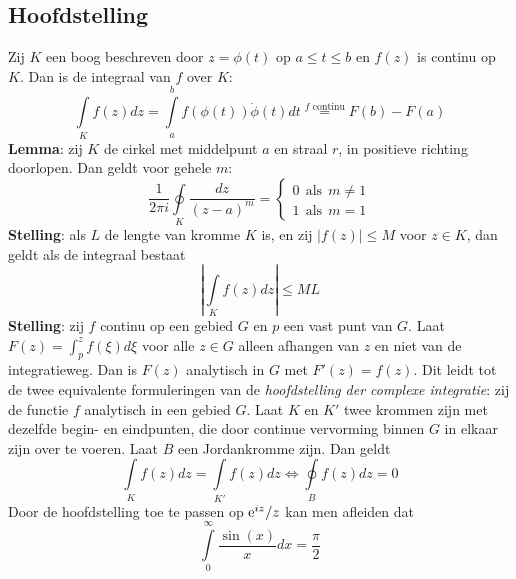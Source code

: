 \subsection{Hoofdstelling}
Zij $K$ een boog beschreven door $z=\phi(t)$ op $a\leq t\leq b$ en $f(z)$
is continu op $K$. Dan is de integraal van $f$ over $K$:
\[
\int\limits_Kf(z)dz=\int\limits_a^bf(\phi(t))\dot{\phi}(t)dt
\stackrel{f\mbox{ continu}}{=}F(b)-F(a)
\]
{\bf Lemma}: zij $K$ de cirkel met middelpunt $a$ en straal $r$, in positieve
richting doorlopen. Dan geldt voor gehele $m$:
\[
\frac{1}{2\pi i}\oint\limits_K \frac{dz}{(z-a)^m}=\left\{
\begin{array}{l}
0~~\mbox{als}~~m\neq1\\
1~~\mbox{als}~~m=1
\end{array}\right.
\]
{\bf Stelling}: als $L$ de lengte van kromme $K$ is, en zij $|f(z)|\leq M$ voor
$z\in K$, dan geldt als de integraal bestaat
\[
\left|\int\limits_K f(z)dz\right|\leq ML
\]
{\bf Stelling}: zij $f$ continu op een gebied $G$ en $p$ een vast punt van
$G$. Laat $F(z)=\int_p^zf(\xi)d\xi$ voor alle $z\in G$ alleen afhangen van
$z$ en niet van de integratieweg. Dan is $F(z)$ analytisch in $G$ met $F'(z)=f(z)$.
\npar
Dit leidt tot de twee equivalente formuleringen van de {\it hoofdstelling der
complexe integratie}: zij de functie $f$ analytisch in een gebied $G$. Laat
$K$ en $K'$ twee krommen zijn met dezelfde begin- en eindpunten, die door
continue vervorming binnen $G$ in elkaar zijn over te voeren. Laat $B$ een
Jordankromme zijn. Dan geldt
\[
\int\limits_Kf(z)dz=\int\limits_{K'}f(z)dz\Leftrightarrow\oint\limits_Bf(z)dz=0
\]
Door de hoofdstelling toe te passen op ${\rm e}^{iz}/z$ kan men afleiden dat
\[
\int\limits_0^\infty\frac{\sin(x)}{x}dx=\frac{\pi}{2}
\]

